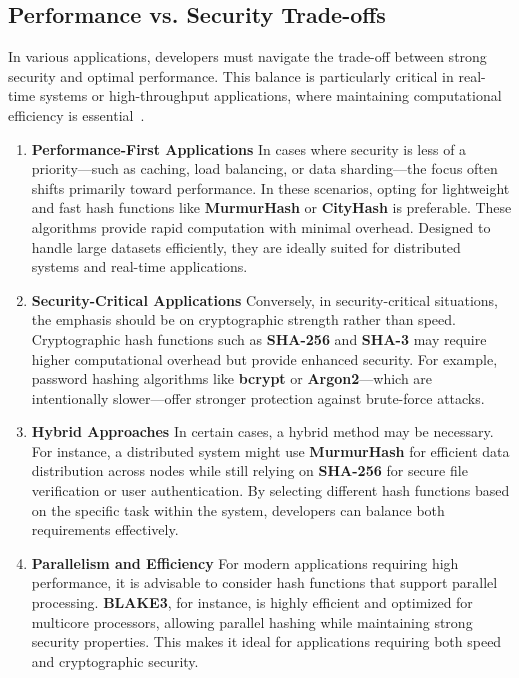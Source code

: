 \documentclass[11pt,a4paper]{article}
\begin{document}
    \subsection*{Performance vs. Security Trade-offs}
    In various applications, developers must navigate the trade-off between strong security and optimal performance. This balance is particularly critical in real-time systems or high-throughput applications, where maintaining computational efficiency is essential~\cite{Performance-vs-Security}.
        \begin{enumerate}
            \item \textbf{Performance-First Applications}
            \newline
            In cases where security is less of a priority—such as caching, load balancing, or data sharding—the focus often shifts primarily toward performance. In these scenarios, opting for lightweight and fast hash functions like \textbf{MurmurHash} or \textbf{CityHash} is preferable. These algorithms provide rapid computation with minimal overhead. Designed to handle large datasets efficiently, they are ideally suited for distributed systems and real-time applications.

            \item \textbf{Security-Critical Applications}
            \newline
            Conversely, in security-critical situations, the emphasis should be on cryptographic strength rather than speed. Cryptographic hash functions such as \textbf{SHA-256} and \textbf{SHA-3} may require higher computational overhead but provide enhanced security. For example, password hashing algorithms like \textbf{bcrypt} or \textbf{Argon2}—which are intentionally slower—offer stronger protection against brute-force attacks.

            \item \textbf{Hybrid Approaches}
            \newline
            In certain cases, a hybrid method may be necessary. For instance, a distributed system might use \textbf{MurmurHash} for efficient data distribution across nodes while still relying on \textbf{SHA-256} for secure file verification or user authentication. By selecting different hash functions based on the specific task within the system, developers can balance both requirements effectively.

            \item \textbf{Parallelism and Efficiency}
            \newline
            For modern applications requiring high performance, it is advisable to consider hash functions that support parallel processing. \textbf{BLAKE3}, for instance, is highly efficient and optimized for multicore processors, allowing parallel hashing while maintaining strong security properties. This makes it ideal for applications requiring both speed and cryptographic security.

        \end{enumerate}
\end{document}
